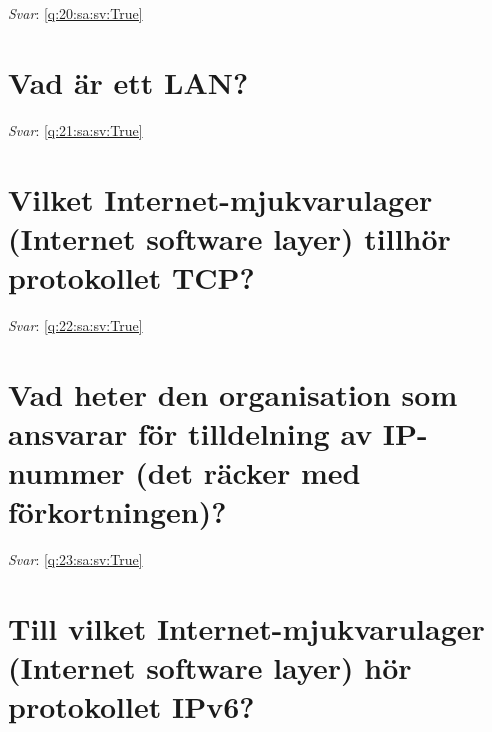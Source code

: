 \documentclass[a4paper,11pt,oneside]{book}
\begin{document}
\begin{sloppypar}
\textit{Svar}: \autoref{q:20:sa:sv:True}



\section{Vad \"ar ett LAN?}

\label{q:21:sa:sv:False}

\vspace{2cm}

\noindent\makebox[\textwidth]{\hrulefill}

\vspace{1cm}

\textit{Svar}: \autoref{q:21:sa:sv:True}



\section{Vilket Internet-mjukvarulager (Internet software layer) tillh\"or protokollet TCP?}

\label{q:22:sa:sv:False}

\vspace{2cm}

\noindent\makebox[\textwidth]{\hrulefill}

\vspace{1cm}

\textit{Svar}: \autoref{q:22:sa:sv:True}



\section{Vad heter den organisation som ansvarar f\"or tilldelning av IP-nummer (det r\"acker med f\"orkortningen)?}

\label{q:23:sa:sv:False}

\vspace{2cm}

\noindent\makebox[\textwidth]{\hrulefill}

\vspace{1cm}

\textit{Svar}: \autoref{q:23:sa:sv:True}



\section{Till vilket Internet-mjukvarulager (Internet software layer) h\"or protokollet IPv6?}


\end{sloppypar}
\end{document}
